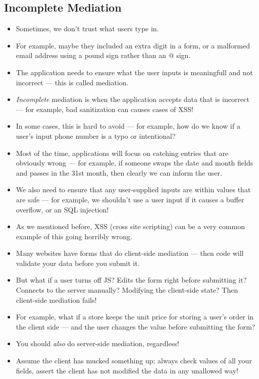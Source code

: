 \documentclass{article}
\begin{document}
\subsection{Incomplete Mediation}
\begin{itemize}
    \item Sometimes, we don't trust what users type in.
    \item For example, maybe they included an extra digit in a form, or a malformed email address using a pound sign rather than an @ sign.
    \item The application needs to ensure what the user inputs is meaningfull and not incorrect --- this is called mediation.
    \item \emph{Incomplete} mediation is when the application accepts data that is incorrect --- for example, bad sanitization can causes cases of XSS!
    \item In some cases, this is hard to avoid --- for example, how do we know if a user's input phone number is a typo or intentional?
    \item Most of the time, applications will focus on catching entries that are obviously wrong --- for example, if someone swaps the date and month fields and passes in the 31st month, then clearly we can inform the user.
    \item We also need to ensure that any user-supplied inputs are within values that are safe --- for example, we shouldn't use a user input if it causes a buffer overflow, or an SQL injection!
    \item As we mentioned before, XSS (cross site scripting) can be a very common example of this going horribly wrong.
    \item Many websites have forms that do client-side mediation --- then code will validate your data before you submit it.
    \item But what if a user turns off JS?  Edits the form right before submitting it?  Connects to the server manually?  Modifying the client-side state?  Then client-side mediation fails!
    \item For example, what if a store keeps the unit price for storing a user's order in the client side --- and the user changes the value before submitting the form?
    \item You should \emph{also} do server-side mediation, regardless!
    \item Assume the client has mucked something up; always check values of all your fields, assert the client has not modified the data in any unallowed way!
\end{itemize}
\end{document}
